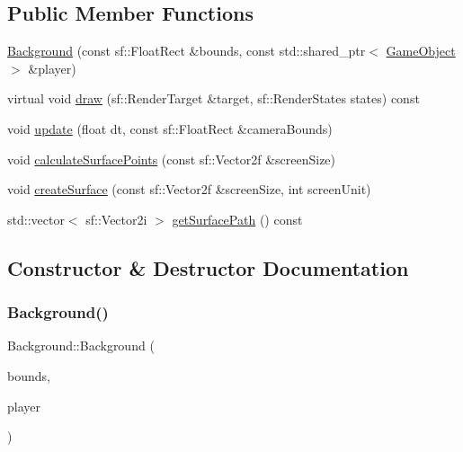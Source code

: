 \subsection*{Public Member Functions}
\begin{DoxyCompactItemize}
\item 
\hyperlink{class_background_aa0ed85ded5e4336ff385b1129c9205ca}{Background} (const sf\+::\+Float\+Rect \&bounds, const std\+::shared\+\_\+ptr$<$ \hyperlink{class_game_object}{Game\+Object} $>$ \&player)
\item 
virtual void \hyperlink{class_background_a607c05c3678be2dee50c736a11e21a50}{draw} (sf\+::\+Render\+Target \&target, sf\+::\+Render\+States states) const
\item 
void \hyperlink{class_background_ae9ead480fcfa060468305134b11e1f40}{update} (float dt, const sf\+::\+Float\+Rect \&camera\+Bounds)
\item 
void \hyperlink{class_background_a7ac5e97fcf0c7f714332be76bbfd19e4}{calculate\+Surface\+Points} (const sf\+::\+Vector2f \&screen\+Size)
\item 
void \hyperlink{class_background_a9efffff9340e0846664ed1a69c6e35e5}{create\+Surface} (const sf\+::\+Vector2f \&screen\+Size, int screen\+Unit)
\item 
std\+::vector$<$ sf\+::\+Vector2i $>$ \hyperlink{class_background_ac22dfc9ac10fd08906b6d68c323d625d}{get\+Surface\+Path} () const
\end{DoxyCompactItemize}


\subsection{Constructor \& Destructor Documentation}
\mbox{\label{class_background_aa0ed85ded5e4336ff385b1129c9205ca}} 
\subsubsection{\texorpdfstring{Background()}{Background()}}
{\footnotesize\ttfamily Background\+::\+Background (\begin{DoxyParamCaption}\item[{const sf\+::\+Float\+Rect \&}]{bounds,  }\item[{const std\+::shared\+\_\+ptr$<$ \hyperlink{class_game_object}{Game\+Object} $>$ \&}]{player }\end{DoxyParamCaption})}

